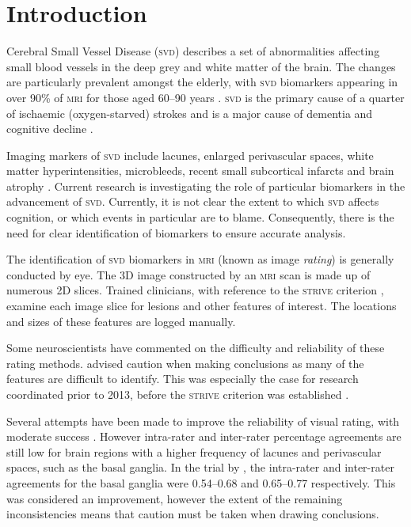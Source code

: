 


\chapter{Introduction}\label{s-intro}

{\noindent} Cerebral Small Vessel Disease (\textsc{svd}) describes a set of abnormalities affecting small blood vessels in the deep grey and white matter of the brain. The changes are particularly prevalent amongst the elderly, with \textsc{svd} biomarkers appearing in over 90\% of \textsc{mri} for those aged 60--90 years \citep{deLeeuwF-E2001Pocw}. \textsc{svd} is the primary cause of a quarter of ischaemic (oxygen-starved) strokes \citep{WardlawJ.M.2013Nsfr} and is a major cause of dementia and cognitive decline \citep{NorrvingBo2008Linb}.

Imaging markers of \textsc{svd} include lacunes, enlarged perivascular spaces, white matter hyperintensities, microbleeds, recent small subcortical infarcts and brain atrophy \citep{WardlawJ.M.2013Nsfr}. Current research is investigating the role of particular biomarkers in the advancement of \textsc{svd}. Currently, it is not clear the extent to which \textsc{svd} affects cognition, or which events in particular are to blame. Consequently, there is the need for clear identification of biomarkers to ensure accurate analysis.

The identification of \textsc{svd} biomarkers in \textsc{mri} (known as image \textit{rating}) is generally conducted by eye. The 3D image constructed by an \textsc{mri} scan is made up of numerous 2D slices. Trained clinicians, with reference to the \textsc{strive} criterion \citep{WardlawJ.M.2013Nsfr}, examine each image slice for lesions and other features of interest. The locations and sizes of these features are logged manually.

Some neuroscientists have commented on the difficulty and reliability of these rating methods. \cite{WardlawJm2013Mosc} advised caution when making conclusions as many of the features are difficult to identify. This was especially the case for research coordinated prior to 2013, before the \textsc{strive} criterion was established \citep{WardlawJ.M.2013Nsfr}.

Several attempts have been made to improve the reliability of visual rating, with moderate success \citep{AdamsH.H.Hieab2013RMfD, PotterGillian2015CPSV}. However intra-rater and inter-rater percentage agreements are still low for brain regions with a higher frequency of lacunes and perivascular spaces, such as the basal ganglia. In the trial by \cite{PotterGillian2015CPSV},  the intra-rater and inter-rater agreements for the basal ganglia were 0.54--0.68 and 0.65--0.77 respectively. This was considered an improvement, however the extent of the remaining inconsistencies means that caution must be taken when drawing conclusions.

